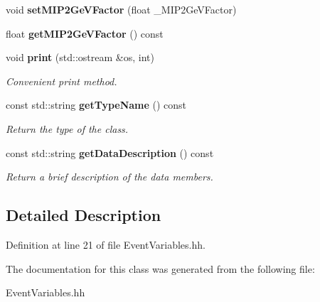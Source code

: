\begin{DoxyCompactItemize}
\item 
void {\bfseries set\-M\-I\-P2\-Ge\-V\-Factor} (float \-\_\-\-M\-I\-P2\-Ge\-V\-Factor)\label{classCALICE_1_1EventVariables_a19d9c61fd6228a4e194926166bc59cf7}

\item 
float {\bfseries get\-M\-I\-P2\-Ge\-V\-Factor} () const \label{classCALICE_1_1EventVariables_a6c40fde4fc8f19eaf92f5a436f63eb65}

\item 
void {\bf print} (std\-::ostream \&os, int)\label{classCALICE_1_1EventVariables_a0c9f937ea00d1e3471489ad0658828ac}

\begin{DoxyCompactList}\small\item\em Convenient print method. \end{DoxyCompactList}\item 
const std\-::string {\bf get\-Type\-Name} () const \label{classCALICE_1_1EventVariables_ac121766d054355bd8a7c004cd1e4a648}

\begin{DoxyCompactList}\small\item\em Return the type of the class. \end{DoxyCompactList}\item 
const std\-::string {\bf get\-Data\-Description} () const \label{classCALICE_1_1EventVariables_a78fc7d200f0109897cdd205f9cf03906}

\begin{DoxyCompactList}\small\item\em Return a brief description of the data members. \end{DoxyCompactList}\end{DoxyCompactItemize}


\subsection{Detailed Description}


Definition at line 21 of file Event\-Variables.\-hh.



The documentation for this class was generated from the following file\-:\begin{DoxyCompactItemize}
\item 
Event\-Variables.\-hh\end{DoxyCompactItemize}
